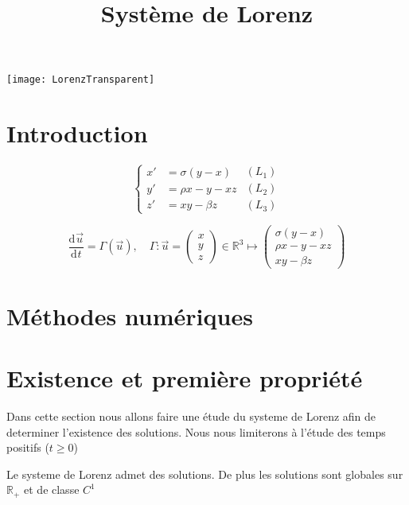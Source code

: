 \documentclass{article}
\title{Système de Lorenz}
\newcommand*\colv[1]{
\left(\begin{array}{c}
    #1
\end{array}\right)
}
\newcommand{\R}{\mathbb{R}}
\newcommand{\deriv}[3][ ]{
    \ensuremath{\frac{\mathrm{d}^{#1}#2}{\mathrm{d}^{#1} #3}}
}
\newtheorem[M]{prop}{Proposition}[section]
\newtheorem[M]{propt}{Propriété}[section]
\newtheorem[L]{thm}{Théoreme}
\newtheorem[L]{cor}{Corollaire}
\begin{document}
\begin{titlepage}
    \vfil
    \texttt{[image: LorenzTransparent]}
\end{titlepage}
\section*{Introduction}

\begin{equation}
    \label{Lorenz}
    \left\{
    \begin{array}{rl}
        x' &=\sigma(y-x) \\
        y' &=\rho x -y - xz\\
        z' &=xy - \beta z
    \end{array}
    \right.
    \begin{array}{r}
        (L_1)\\
        (L_2)\\
        (L_3)
    \end{array}
\end{equation}

\begin{equation}
    \label{fLorenz}
    \deriv{\Vec{u}}{t} = \Gamma(\Vec{u}), \quad
    \Gamma : \Vec{u} = \colv{x\\y\\z} \in \R^3 \mapsto \colv{\sigma(y-x) \\ \rho x-y-xz \\ xy-\beta z}
    \end{equation}

\section{Méthodes numériques}


\section{Existence et première propriété}

Dans cette section nous allons faire une étude du systeme de Lorenz afin de determiner l'existence des solutions. Nous nous limiterons à l'étude des temps positifs ($t \ge 0$)

\begin{prop}
    Le systeme de Lorenz admet des solutions. De plus les solutions sont globales sur $\R_+$ et de classe $C^1$
\end{prop}
\end{document}
